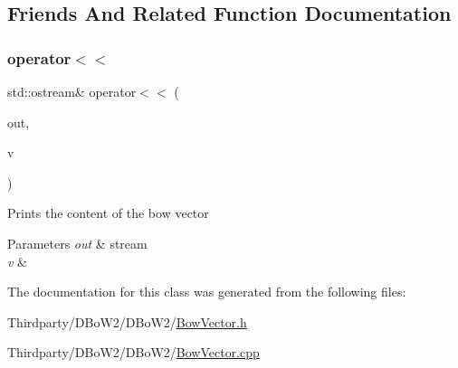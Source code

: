 \subsection{Friends And Related Function Documentation}
\mbox{\label{class_d_bo_w2_1_1_bow_vector_a1a7d9ac0f9128538859adfea38453ae1}} 
\subsubsection{\texorpdfstring{operator$<$$<$}{operator<<}}
{\footnotesize\ttfamily std\+::ostream\& operator$<$$<$ (\begin{DoxyParamCaption}\item[{std\+::ostream \&}]{out,  }\item[{const \mbox{\hyperlink{class_d_bo_w2_1_1_bow_vector}{Bow\+Vector}} \&}]{v }\end{DoxyParamCaption})\hspace{0.3cm}{\ttfamily [friend]}}

Prints the content of the bow vector 
\begin{DoxyParams}{Parameters}
{\em out} & stream \\
\hline
{\em v} & \\
\hline
\end{DoxyParams}


The documentation for this class was generated from the following files\+:\begin{DoxyCompactItemize}
\item 
Thirdparty/\+D\+Bo\+W2/\+D\+Bo\+W2/\mbox{\hyperlink{_bow_vector_8h}{Bow\+Vector.\+h}}\item 
Thirdparty/\+D\+Bo\+W2/\+D\+Bo\+W2/\mbox{\hyperlink{_bow_vector_8cpp}{Bow\+Vector.\+cpp}}\end{DoxyCompactItemize}
